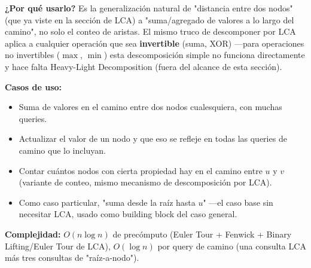 \documentclass[10pt,a4paper,twocolumn]{article}
\begin{document}
\textbf{¿Por qué usarlo?} Es la generalización natural de "distancia
entre dos nodos" (que ya viste en la sección de LCA) a "suma/agregado
de valores a lo largo del camino", no solo el conteo de aristas. El
mismo truco de descomponer por LCA aplica a cualquier operación que
sea \textbf{invertible} (suma, XOR) —para operaciones no invertibles
($\max$, $\min$) esta descomposición simple no funciona directamente
y hace falta Heavy-Light Decomposition (fuera del alcance de esta
sección).

\textbf{Casos de uso:}

\begin{itemize}
    \item Suma de valores en el camino entre dos nodos cualesquiera,
    con muchas queries.
    \item Actualizar el valor de un nodo y que eso se refleje en
    todas las queries de camino que lo incluyan.
    \item Contar cuántos nodos con cierta propiedad hay en el camino
    entre $u$ y $v$ (variante de conteo, mismo mecanismo de
    descomposición por LCA).
    \item Como caso particular, "suma desde la raíz hasta $u$" —el
    caso base sin necesitar LCA, usado como building block del caso
    general.
\end{itemize}

\textbf{Complejidad:} $O(n \log n)$ de precómputo (Euler Tour +
Fenwick + Binary Lifting/Euler Tour de LCA), $O(\log n)$ por query
de camino (una consulta LCA más tres consultas de "raíz-a-nodo").
\end{document}
